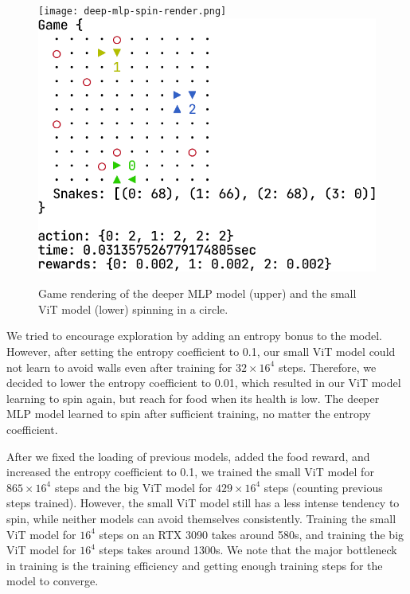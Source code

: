 \documentclass[conference]{IEEEtran}
\begin{document}
\begin{figure}
    \centering
    \texttt{[image: deep-mlp-spin-render.png]}\\[24pt]
    \includegraphics[width=\linewidth]{vit_spin_render.png}
    \caption{Game rendering of the deeper MLP model (upper)
        and the small ViT model (lower) spinning in a circle.
    }
    \label{fig:render}
\end{figure}

We tried to encourage exploration by adding an entropy bonus to the model.
However, after setting the entropy coefficient to 0.1,
our small ViT model could not learn to avoid walls even after training for
$32\times 16^4$ steps. Therefore,
we decided to lower the entropy coefficient to 0.01,
which resulted in our ViT model learning to spin again,
but reach for food when its health is low.
The deeper MLP model learned to spin after sufficient training,
no matter the entropy coefficient.

After we fixed the loading of previous models, added the food reward,
and increased the entropy coefficient to 0.1,
we trained the small ViT model for $865\times 16^4$ steps and the big ViT model
for $429\times 16^4$ steps (counting previous steps trained). However,
the small ViT model still has a less intense tendency to spin,
while neither models can avoid themselves consistently.
Training the small ViT model for $16^4$ steps on an RTX 3090 takes around 580s,
and training the big ViT model for $16^4$ steps takes around 1300s.
We note that the major bottleneck in training is the training efficiency and
getting enough training steps for the model to converge.
\end{document}
